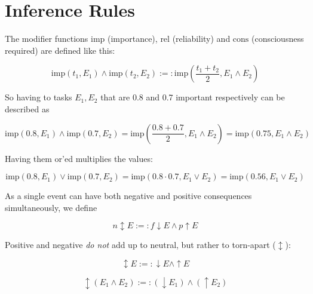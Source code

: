 \documentclass{scrartcl}
\begin{document}

\section{Inference Rules}

The modifier functions $\textrm{imp}$ (importance), $\textrm{rel}$ (reliability) and $\textrm{cons}$ (consciousness required) are defined like this:

\begin{equation} \textrm{imp}(t_1, E_1) \wedge \textrm{imp}(t_2, E_2) :=: \textrm{imp}(\frac{t_1 + t_2}{2}, E_1 \wedge E_2) \end{equation}

So having to tasks $E_1, E_2$ that are 0.8 and 0.7 important respectively can be described as

\begin{equation} \textrm{imp}(0.8, E_1) \wedge \textrm{imp}(0.7, E_2) = \textrm{imp}\left(\frac{0.8 + 0.7}{2}, E_1 \wedge E_2\right) = \textrm{imp}(0.75, E_1 \wedge E_2)\end{equation}

Having them or'ed multiplies the values:

\begin{equation} \textrm{imp}(0.8, E_1) \lor \textrm{imp}(0.7, E_2) = \textrm{imp}\left(0.8 \cdot 0.7, E_1 \lor E_2\right) = \textrm{imp}(0.56, E_1 \lor E_2)\end{equation}

As a single event can have both negative and positive consequences simultaneously, we define

\begin{equation}n \updownarrow E :=: f \downarrow E \wedge p \uparrow E\end{equation}

Positive and negative \textit{do not} add up to neutral, but rather to torn-apart ($\updownarrow$):

\begin{equation}\updownarrow E :=: \downarrow E \wedge \uparrow E\end{equation}

\begin{equation}\updownarrow \left(E_1 \wedge E_2\right) :=: \left(\downarrow E_1\right) \wedge \left(\uparrow E_2\right) \end{equation}
\end{document}
